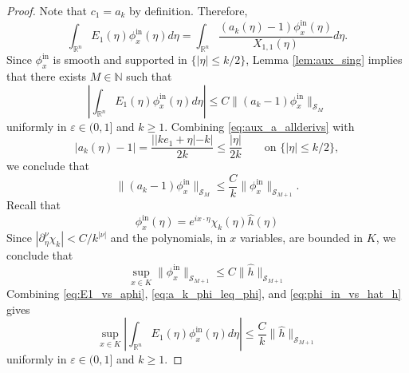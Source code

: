 \documentclass[12pt,a4paper]{amsart}
\numberwithin{equation}{section}
\theoremstyle{plain}
\theoremstyle{definition}
\begin{document}
\begin{proof}
Note that $c_1 = a_k$ by definition. Therefore, 
\begin{equation*}
    \int_{\mathbb{R}^n} E_1(\eta) \phi_x^{\mathrm{in}}(\eta) d\eta
    =
    \int_{\mathbb{R}^n} \frac{(a_k(\eta) - 1) \phi_x^{\mathrm{in}}(\eta)}{X_{1,1}(\eta)} d\eta.
\end{equation*}
Since $\phi_x^{\mathrm{in}}$ is smooth and supported in $\{|\eta| \leq k/2\}$, Lemma \ref{lem:aux_sing} implies that there exists $M \in \mathbb{N}$ such that
\begin{equation}\label{eq:E1_vs_aphi}
    \left|\int_{\mathbb{R}^n} E_1(\eta) \phi_x^{\mathrm{in}}(\eta) d\eta \right| 
    \leq 
    C \|(a_k - 1)\phi_x^{\mathrm{in}}\|_{\mathscr{S}_M}
\end{equation}
uniformly in $\varepsilon\in (0,1]$ and $k\geq 1$. Combining \eqref{eq:aux_a_allderivs} with
\begin{equation*}
    |a_k(\eta) - 1|
    =
    \frac{||ke_1 + \eta| - k|}{2k}
    \leq
    \frac{|\eta|}{2k}
    \qquad
    \text{on }
    \{|\eta| \leq k/2\},
\end{equation*}
we conclude that 
\begin{equation}\label{eq:a_k_phi_leq_phi}
    \|(a_k - 1) \phi_x^{\mathrm{in}}\|_{\mathscr{S}_M} \leq \frac{C}{k} \| \phi_x^{\mathrm{in}}\|_{\mathscr{S}_{M+1}}.
\end{equation}
Recall that
\begin{equation*}
    \phi_x^{\mathrm{in}}(\eta) = e^{ix\cdot\eta}\chi_k(\eta)\widehat h(\eta)
\end{equation*}
Since $|\partial_\eta^\nu \chi_k| < C/k^{|\nu|}$ and the polynomials, in $x$ variables, are bounded in $K$, we conclude that
\begin{equation}\label{eq:phi_in_vs_hat_h}
    \sup_{x \in K} \| \phi_x^{\mathrm{in}}\|_{\mathscr{S}_{M+1}} \leq C \|\widehat h\|_{\mathscr{S}_{M+1}} 
\end{equation}
Combining \eqref{eq:E1_vs_aphi}, \eqref{eq:a_k_phi_leq_phi}, and \eqref{eq:phi_in_vs_hat_h} gives
\begin{equation}\label{eq:E1}
     \sup_{x \in K}\left|\int_{\mathbb{R}^n} E_1(\eta) \phi_x^{\mathrm{in}}(\eta) d\eta \right| \leq \frac{C}{k} \|\widehat h\|_{\mathscr{S}_{M+1}} 
\end{equation}
uniformly in $\varepsilon \in (0,1]$ and $k\geq 1$.


\end{proof}
\end{document}
